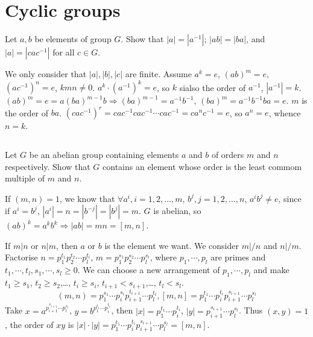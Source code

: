 \section{Cyclic groups}
\begin{ex}
    Let $a,b$ be elements of group $G$. Show that $\left| a \right| =\left| a^{-1} \right| $; $\left| ab \right| =\left| ba \right| $, and $\left| a \right| =\left| cac^{-1} \right| $ for all $c\in G$.
\end{ex}

\begin{answer}
    We only consider that $\left| a \right| , \left| b \right| , \left| c \right| $ are finite. Assume $a^{k}=e$, $(ab)^{m}=e$, $(ac^{-1})^{n}=e$, $kmn\neq 0$. $a^{k}\cdot(a^{-1})^{k}=e$, so $k$ sialso the order of $a^{-1}$, $\left| a^{-1} \right| =k$. $(ab)^{m}=e=a(ba)^{m-1}b\Rightarrow (ba)^{m-1}=a^{-1}b^{-1}$, $(ba)^{m}=a^{-1}b^{-1}ba=e$. $m$ is the order of $ba$. $(cac^{-1})^{r}=cac^{-1}cac^{-1}\cdots cac^{-1}=ca^{n}c^{-1}=e$, so $a^{n}=e$, whence $n=k$.
\end{answer}

$$ $$

\begin{ex}
    Let $G$ be an abelian group containing elements $a$ and $b$ of orders $m$ and $n$ respectively. Show that $G$ contains an element whose order is the least commom multiple of $m$ and $n$.
\end{ex}

\begin{answer}
    If $(m,n)=1$, we know that $\forall a^{i}, i=1,2,\dots, m$, $b^{j}, j=1, 2, \dots, n$, $a^{i}b^{j}\neq e$, since if $a^{i}=b^{j}$, $\left| a^{i} \right| =n=\left| b^{-j} \right| =\left| b^{j} \right| =m$. $G$ is abelian, so $(ab)^{k}=a^{k}b^{k}\Rightarrow \left| ab \right|=mn=\left[ m,n\right]$.

    If $m|n$ or $n|m$, then $a$ or $b$ is the element we want. We consider $m|\!\!/n$ and $n|\!\!/m$. Factorise $n=p_{1}^{t_{1}}p_{2}^{t_{2}}\cdots p_{l}^{t_{l}}$, $m=p_{1}^{s_{1}}p_{2}^{s_{2}}\cdots p_{l}^{s_{l}}$, where $p_{1},\cdots,p_{l}$ are primes and $t_{1},\cdots,t_{l}, s_{1},\cdots, s_{l}\geq 0$. We can choose a new arrangement of $p_{1},\cdots,p_{l}$ and make $t_{1}\geq s_{1}$, $t_{2}\geq s_{2}$,\dots, $t_{i}\geq s_{i}$, $t_{i+1}<s_{i+1}$,\dots, $t_{l}<s_{l}$.\[(m,n)=p_{1}^{s_{1}}\cdots p_{i}^{s_{i}}p_{i+1}^{t_{i+1}}\cdots p_{l}^{t_{l}}, \left[m,n\right]=p_{1}^{t_{1}}\cdots p_{i}^{t_{i}}p_{i+1}^{s_{i+1}}\cdots p_{l}^{s_{l}}\] Take $x=a^{{p_{i+1}^{s_{i+1}}}\cdots p_{l}^{s_{l}}}$, $y=b^{{p_{1}^{t_{1}}}\cdots p_{i}^{t_{i}}}$, then $\left| x \right| ={p_{1}^{t_{1}}}\cdots p_{i}^{t_{i}}$, $\left| y \right| =p_{i+1}^{s_{i+1}}\cdots p_{l}^{s_{l}}$. Thus $(x,y)=1$, the order of $xy$ is $\left| x \right| \cdot\left| y \right| =p_{1}^{t_{1}}\cdots p_{i}^{t_{i}}p_{i+1}^{s_{i+1}}\cdots p_{l}^{s_{l}}=\left[m,n\right]$.
\end{answer}

